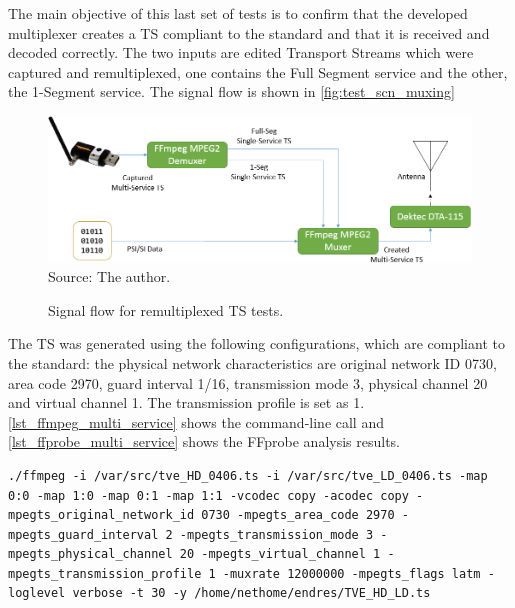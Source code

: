 \documentclass[12pt,a4paper]{article}
\begin{document}
The main objective of this last set of tests is to confirm that the developed multiplexer creates a TS compliant to the standard and that it is received and decoded correctly. The two inputs are edited Transport Streams which were captured and remultiplexed, one contains the Full Segment service and the other, the 1-Segment service. The signal flow is shown in \autoref{fig:test_scn_muxing}

\begin{figure}[!h]
\centering
\caption{Signal flow for remultiplexed TS tests.}
\includegraphics[width=0.8\linewidth]{pictures/test_scn_muxing.png}
\\Source: The author.
\label{fig:test_scn_muxing}
\end{figure}

The TS was generated using the following configurations, which are compliant to the standard: the physical network characteristics are original network ID 0730, area code 2970, guard interval 1/16, transmission mode 3, physical channel 20 and virtual channel 1. The transmission profile is set as 1. \autoref{lst_ffmpeg_multi_service} shows the command-line call and \autoref{lst_ffprobe_multi_service} shows the FFprobe analysis results.

\begin{minipage}{\linewidth}
\begin{lstlisting}[caption={FFmpeg command-line call to generate a multi-service TS}, label={lst_ffmpeg_multi_service}]
./ffmpeg -i /var/src/tve_HD_0406.ts -i /var/src/tve_LD_0406.ts -map 0:0 -map 1:0 -map 0:1 -map 1:1 -vcodec copy -acodec copy -mpegts_original_network_id 0730 -mpegts_area_code 2970 -mpegts_guard_interval 2 -mpegts_transmission_mode 3 -mpegts_physical_channel 20 -mpegts_virtual_channel 1 -mpegts_transmission_profile 1 -muxrate 12000000 -mpegts_flags latm -loglevel verbose -t 30 -y /home/nethome/endres/TVE_HD_LD.ts
\end{lstlisting}
\end{minipage}
\end{document}
